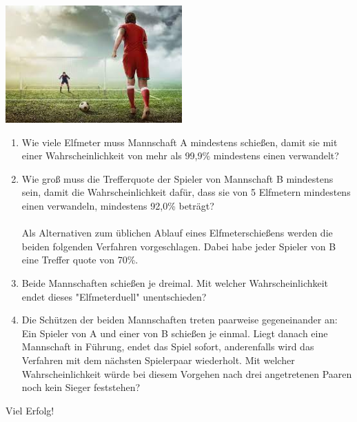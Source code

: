 \documentclass[a4paper,12pt]{article}
\begin{document}
\begin{center}
  {\includegraphics[height=4.5cm]{Q12_1Klausur_Ana_Sto_v2_NachholTermin_01.jpeg}}
\end{center}

\begin{enumerate}[label={\alph*)}] 
  \item Wie viele Elfmeter muss Mannschaft A mindestens schießen, damit sie mit einer Wahrscheinlichkeit von mehr als 99,9\% mindestens einen verwandelt? 
  \item Wie groß muss die Trefferquote der Spieler von Mannschaft B mindestens sein, damit die Wahrscheinlichkeit dafür, dass sie von 5 Elfmetern mindestens einen verwandeln, mindestens 92,0\% beträgt?\\
\\
Als Alternativen zum üblichen Ablauf eines Elfmeterschießens werden die beiden folgenden Verfahren vorgeschlagen. Dabei habe jeder Spieler von B eine Treffer quote von 70\%.

\item Beide Mannschaften schießen je dreimal. Mit welcher Wahrscheinlichkeit endet dieses "Elfmeterduell" unentschieden? 
\item Die Schützen der beiden Mannschaften treten paarweise gegeneinander an: Ein Spieler von A und einer von B schießen je einmal. Liegt danach eine Mannschaft in Führung, endet das Spiel sofort, anderenfalls wird das Verfahren mit dem nächsten Spielerpaar wiederholt. Mit welcher Wahrscheinlichkeit würde bei diesem Vorgehen nach drei angetretenen Paaren noch kein Sieger feststehen?
\end{enumerate}

\vspace{3cm}

\begin{center}
  Viel Erfolg!
\end{center}

\end{document}
